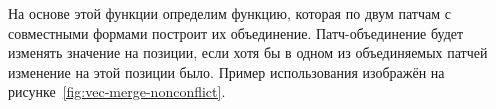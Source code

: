На основе этой функции определим функцию, которая по двум патчам с
совместными формами построит их объединение. Патч-объединение будет
изменять значение на позиции, если хотя бы в одном из объединяемых
патчей изменение на этой позиции было. Пример использования
 изображён на
рисунке~\ref{fig:vec-merge-nonconflict}.

\begin{code}%
\>[0]\<[2]%
\>[2] \AgdaSymbol{:}  \AgdaSymbol{\{}\AgdaSymbol{\}} \AgdaSymbol{\{}  \AgdaSymbol{:}  \AgdaSymbol{\}} \AgdaSymbol{(} \AgdaSymbol{:}  \AgdaSymbol{)} \AgdaSymbol{(} \AgdaSymbol{:}  \AgdaSymbol{)}\<%
\\
\>[2]\<[4]%
\>[4] \AgdaSymbol{(} \AgdaSymbol{:}   \AgdaSymbol{)}   \AgdaSymbol{(} \AgdaSymbol{)} \<[49]%
\>[49]\<%
\\
\>[0]\<[2]%
\>[2]    \AgdaSymbol{=} \<%
\\
\>[0]\<[2]%
\>[2] \AgdaSymbol{(} \AgdaSymbol{)} \AgdaSymbol{(} \AgdaSymbol{)} \AgdaSymbol{(} \AgdaSymbol{)} \AgdaSymbol{=}  \AgdaSymbol{((}  \AgdaSymbol{)} \AgdaSymbol{)}\<%
\\
\>[0]\<[2]%
\>[2] \AgdaSymbol{(} \AgdaSymbol{)} \AgdaSymbol{(}     \AgdaSymbol{)} \AgdaSymbol{(} \AgdaSymbol{)} \AgdaSymbol{=} \<[49]%
\>[49]\<%
\\
\>[2]\<[4]%
\>[4]     \AgdaSymbol{(}  \AgdaSymbol{)} \<%

\end{code}
